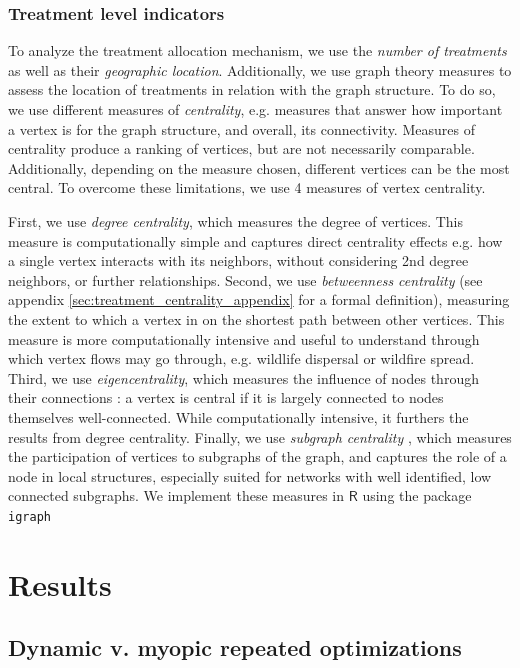 \subsubsection{Treatment level indicators}
\label{sec:treatment_centrality}
To analyze the treatment allocation mechanism, we use the \textit{number of treatments} as well as their \textit{geographic location}. Additionally, we use graph theory measures to assess the location of treatments in relation with the graph structure. To do so, we use different measures of \textit{centrality}, e.g. measures that answer how important a vertex is for the graph structure, and overall, its connectivity. Measures of centrality produce a ranking of vertices, but are not necessarily comparable. Additionally, depending on the measure chosen, different vertices can be the most central. To overcome these limitations, we use 4 measures of vertex centrality. 

First, we use \textit{degree centrality}, which measures the degree of vertices. This measure is computationally simple and captures direct centrality effects e.g. how a single vertex interacts with its neighbors, without considering 2nd degree neighbors, or further relationships. Second, we use \textit{betweenness centrality} (see appendix \ref{sec:treatment_centrality_appendix} for a formal definition), measuring the extent to which a vertex in on the shortest path between other vertices. This measure is more computationally intensive and  useful to understand through which vertex flows may go through, e.g. wildlife dispersal or wildfire spread. Third, we use \textit{eigencentrality}, which measures the influence of nodes through their connections : a vertex is central if it is largely connected to nodes themselves well-connected. While computationally intensive, it furthers the results from degree centrality. Finally, we use \textit{subgraph centrality} \citep{estrada_subgraph_2005}, which measures the participation of vertices to subgraphs of the graph, and captures the role of a node in local structures, especially suited for networks with well identified, low connected subgraphs. We implement these measures in $\textsf{R}$ using the package \texttt{igraph} \citep{Csrdi2006TheIS}



\section{Results}

\subsection{Dynamic v. myopic repeated optimizations}

